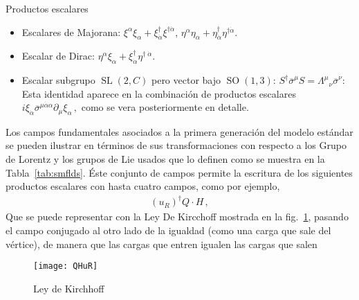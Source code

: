 \begin{frame}
Productos escalares
\begin{itemize}
\item Escalares de Majorana: $\xi^{\alpha}\xi_{\alpha}+\xi^{\dagger}_{ \dot{\alpha}}\xi^{\dagger \dot{\alpha}}$, $\eta^{\alpha}\eta_{\alpha}+\eta^{\dagger}_{ \dot{\alpha}}\eta^{\dagger \dot{\alpha}}$.
\item Escalar de Dirac: $\eta^{\alpha}\xi_{\alpha}+ \xi^{\dagger}_{\dot{\alpha}}\eta^{\dagger\;\dot{\alpha  }} $.


 \item Escalar subgrupo $\operatorname{SL}(2,C)$ pero vector bajo $\operatorname{SO}(1,3)$: $ S^\dagger\overline{\sigma}^\mu S={\Lambda^\mu}_\nu\overline{\sigma}^\nu$: Esta identidad aparece en la combinación de productos escalares
  $i\xi_{\dot{\alpha}} \overline{\sigma}^{\mu\dot{\alpha} \alpha} \partial_{\mu} \xi_{\alpha} \,,$
como se vera posteriormente en detalle.
\end{itemize}


\end{frame}

Los campos fundamentales asociados a la primera generación del modelo estándar se pueden ilustrar en términos de sus transformaciones con respecto a los Grupo de Lorentz y los grupos de Lie usados que lo definen como se muestra en la Tabla~\ref{tab:smflds}. Éste conjunto de campos permite la escritura de los siguientes productos escalares con hasta cuatro campos, como por ejemplo,
\begin{align}
    \left( u_R \right)^{\dagger} Q\cdot H\,,
\end{align}
Que se puede representar con la  Ley De Kircchoff mostrada en la fig.~\ref{fig:lkg}, pasando el campo conjugado al otro lado de la igualdad (como una carga que sale del vértice), de manera que las cargas que entren igualen las cargas que salen
\begin{figure}
  \centering
  \texttt{[image: QHuR]} \hspace{1cm}
  \caption{Ley de Kirchhoff}
  \label{fig:lkg}
\end{figure}


